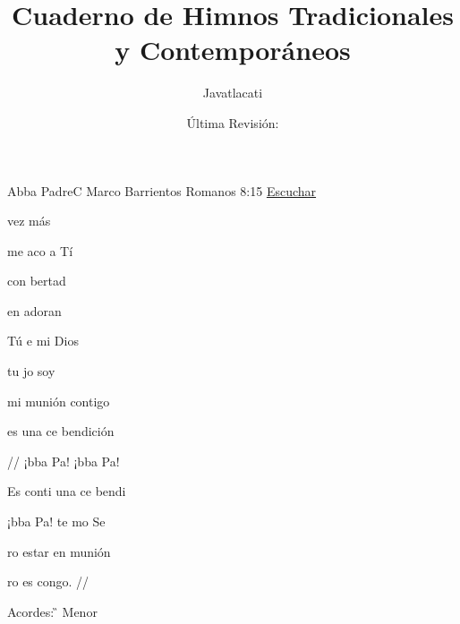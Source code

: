 \documentclass[12pt, spanish]{book}
\title{Cuaderno de Himnos Tradicionales y Contemporáneos}
\author{Javatlacati}
\date{\'Ultima Revisión:  \RevDate}
\newcommand{\RevDate}{\today}
\newcommand{\NotCCLIed}{\relax}
\begin{document}
\maketitle

\mainmatter
\ifWordBk
  \twocolumn
\fi



\begin{song}{Abba Padre}{C}
  {} %
  {Marco Barrientos}
  {Romanos 8:15} %
  {\href{http://open.spotify.com/track/0yj0zBaa7Ckn6ZMQPmCmfF}{Escuchar}} %


  \begin{SBVerse}
 vez más

me aco a Tí

con bertad

en adoran
  \end{SBVerse}
  \begin{SBVerse}
Tú e mi Dios

tu jo soy

mi munión contigo

es una ce bendición
  \end{SBVerse}

  \begin{SBChorus}
// ¡bba Pa! ¡bba Pa!

Es conti  una ce bendi

¡bba Pa! te mo Se

ro estar en munión

ro es congo. //
  \end{SBChorus}
\ifChordBk
\begin{SBOpGroup}
    Acordes:
\keyboard[Do][Fso][Ao]\D\keyboard[Do][Go][Bo]\G



  Menor
  \end{SBOpGroup}
\fi
\end{song}
\end{document}
